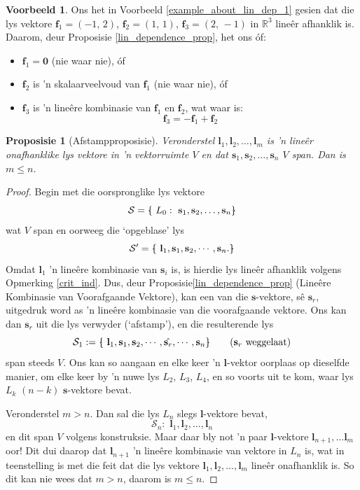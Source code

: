 \documentclass[a4paper,11pt]{book}
\newtheorem{proposition}[theorem]{Proposisie}
\theoremstyle{definition}
\newtheorem{example_environment}{Voorbeeld}[chapter]
\newcommand{\be}{\begin{equation}}
\newcommand{\ee}{\end{equation}}
\newcommand{\ve}[1]{\mathbf{#1}}
\newcommand{\basis}[1]{{\mathcal #1}}
\newenvironment{example}
	{
		\begin{oframed}
		\begin{example_environment}
	}
	{
		\end{example_environment}
		\end{oframed}
	}
\newcommand{\bmark}{\raisebox{.53ex}{\rule{.2em}{.1ex}}}
\newcommand{\bopen}{{\protect\ooalign{\{\cr\hfil\bmark\hfil\cr}}}
\newcommand{\bclose}{{\protect\ooalign{\}\cr\hfil\bmark\hfil\cr}}}
\begin{document}
\begin{example} \label{app_of_prop_preceding} Ons het in Voorbeeld
	\ref{example_about_lin_dep_1} gesien dat die lys vektore $\ve{f}_1 =
	(-1, \, 2)$, $\ve{f}_2 = (1, \,1)$,
	$\ve{f}_3 = (2, \, -1)$ in $\mathbb{R}^3$ line{\^e}r afhanklik is.
	Daarom, deur Proposisie \ref{lin_dependence_prop}, het ons óf:
	\begin{itemize}
		\item $\ve{f}_1 = \ve{0}$ (nie waar nie), óf
		\item $\ve{f}_2$ is 'n skalaarveelvoud van $\ve{f}_1$ (nie waar
			nie), óf
		\item $\ve{f}_3$ is 'n line{\^e}re kombinasie van $\ve{f}_1$ en
			$\ve{f}_2$, wat waar is:
			\[
				\ve{f}_3 = - \ve{f}_1 + \ve{f}_2
			\]
	\end{itemize}
\end{example}


\begin{proposition}[Afstampproposisie] Veronderstel $\ve{l}_1, \ve{l}_2,
	\ldots, \ve{l}_m$ is 'n line{\^e}r onafhanklike lys vektore in 'n
	vektorruimte $V$ en dat  $\ve{s}_1, \ve{s}_2, \ldots, \ve{s}_n$ $V$
	span. Dan is $m \leq n$. \label{bumping_off_lemma}
\end{proposition}
\begin{proof} Begin met die oorspronglike lys vektore
	\be
	\basis{S} = \bopen \,\, L_0: \,\,  \ve{s}_1, \ve{s}_2, \ldots, \ve{s}_n
	\bclose
	\ee
	wat $V$ span en oorweeg die `opgeblase' lys
	\be \label{bloated_list}
	\basis{S^{\prime}} = \bopen \,\, \ve{l}_1, \ve{s}_1, \ve{s}_2, \cdots,
	\ve{s}_n.
	\bclose
	\ee
	Omdat $\ve{l}_1$ 'n line{\^e}re kombinasie van $\ve{s}_i$ is, is
	hierdie lys line{\^e}r afhanklik volgens Opmerking \ref{crit_ind}. Dus,
	deur Proposisie\ref{lin_dependence_prop} (Line{\^e}re Kombinasie van
	Voorafgaande Vektore), kan een van die $\ve{s}$-vektore, s{\^e}
	$\ve{s}_r$, uitgedruk word as 'n line{\^e}re kombinasie van die
	voorafgaande vektore. Ons kan dan $\ve{s}_r$ uit die lys verwyder
	(`afstamp'), en die resulterende lys
	\be
	\basis{S_1}:= \bopen \,\, \ve{l}_1, \ve{s}_1, \ve{s}_2, \cdots,
	\hat{\ve{s}_r}, \cdots,
	\ve{s}_n  \bclose \qquad \mbox{($\ve{s}_r$ weggelaat)}
	\ee
	span steeds $V$. Ons kan so aangaan en elke keer 'n $\ve{l}$-vektor
	oorplaas op dieselfde manier, om elke keer by 'n nuwe lys $L_2$, $L_3$,
	$L_4$, en so voorts uit te kom, waar lys $L_k$ $(n-k)$ $\ve{s}$-vektore
	bevat.

	Veronderstel $m > n$. Dan sal die lys $L_n$ slegs $\ve{l}$-vektore
	bevat,
	\[
		\basis{S_n}: \,\, \ve{l}_1, \ve{l}_2, \ldots, \ve{l}_n
	\]
	en dit span $V$ volgens konstruksie. Maar daar bly not 'n paar
	$\ve{l}$-vektore $\ve{l}_{n+1}, \ldots \ve{l}_{m}$ oor! Dit dui daarop
	dat $\ve{l}_{n+1}$ 'n line{\^e}re kombinasie van vektore in $L_n$ is,
	wat in teenstelling is met die feit dat die lys vektore $\ve{l}_1,
	\ve{l}_2, \ldots, \ve{l}_m$ line{\^e}r onafhanklik is. So dit kan nie
	wees dat $m > n$, daarom is $m \leq n$.
\end{proof}
\end{document}
